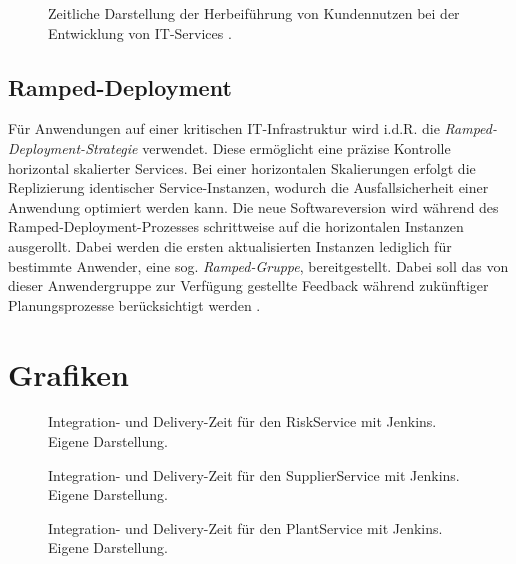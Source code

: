 \begin{center}
	\begin{figure}[H]
		\centering
		\caption[Zeitliche Darstellung der Herbeiführung von Kundennutzen bei der Entwicklung von IT-Services]{Zeitliche Darstellung der Herbeiführung von Kundennutzen bei der Entwicklung von IT-Services \cite[9]{Halstenberg.2020}.}
		\label{fig:TTM}
	\end{figure}
\end{center}
\vspace*{-15mm}


\subsection{Ramped-Deployment}
Für Anwendungen auf einer kritischen IT-Infrastruktur wird i.d.R. die \textit{Ramped-Deployment-Strategie} verwendet. Diese ermöglicht eine präzise Kontrolle horizontal skalierter Services. Bei einer horizontalen Skalierungen erfolgt die Replizierung identischer Service-Instanzen, wodurch die Ausfallsicherheit einer Anwendung optimiert werden kann. Die neue Softwareversion wird während des Ramped-Deployment-Prozesses schrittweise auf die horizontalen Instanzen ausgerollt. Dabei werden die ersten aktualisierten Instanzen lediglich für bestimmte Anwender, eine sog. \textit{Ramped-Gruppe}, bereitgestellt. Dabei soll das von dieser Anwendergruppe zur Verfügung gestellte Feedback während zukünftiger Planungsprozesse berücksichtigt werden \cite{Ugochi.20220503}.



\newpage
\section{Grafiken}
\begin{center}
	\begin{figure}[H]
		\centering
		\caption[]{Integration- und Delivery-Zeit für den RiskService mit Jenkins. Eigene Darstellung.}
		\label{fig:JP_Risk}
	\end{figure}
\end{center}

\begin{center}
	\begin{figure}[H]
		\centering
		\caption[]{Integration- und Delivery-Zeit für den SupplierService mit Jenkins. Eigene Darstellung.}
		\label{fig:JP_Supplier}
	\end{figure}
\end{center}
\begin{center}
	\begin{figure}[H]
		\centering
		\caption[]{Integration- und Delivery-Zeit für den PlantService mit Jenkins. Eigene Darstellung.}
		\label{fig:JP_Plant}
	\end{figure}
\end{center}
\newpage
